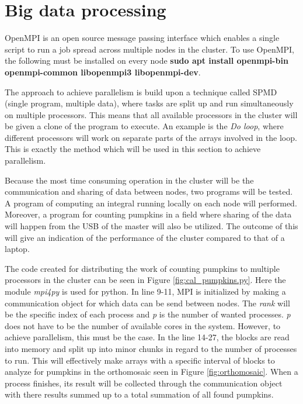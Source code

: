 \documentclass[../Head/Report.tex]{subfiles}
\begin{document}
\section{Big data processing}

OpenMPI is an open source message passing interface which enables a single script to run a job spread across multiple nodes in the cluster. To use OpenMPI, the following must be installed on every node \textbf{sudo apt install openmpi-bin openmpi-common libopenmpi3 libopenmpi-dev}. 

The approach to achieve parallelism is build upon a technique called SPMD (single program, multiple data), where tasks are split up and run simultaneously on multiple processors. This means that all available processors in the cluster will be given a clone of the program to execute. An example is the \textit{Do loop}, where different processors will work on separate parts of the arrays involved in the loop. This is exactly the method which will be used in this section to achieve parallelism.\cite{SPMD}    

Because the most time consuming operation in the cluster will be the communication and sharing of data between nodes, two programs will be tested. A program of computing an integral running locally on each node will performed. Moreover, a program for counting pumpkins in a field where sharing of the data will happen from the USB of the master will also be utilized. The outcome of this will give an indication of the performance of the cluster compared to that of a laptop.     

The code created for distributing the work of counting pumpkins to multiple processors in the cluster can be seen in Figure \ref{fig:cal_pumpkins.py}. Here the module \textit{mpi4py} is used for python. In line 9-11, MPI is initialized  by making a communication object for which data can be send between nodes. The \textit{rank} will be the specific index of each process and \textit{p} is the number of wanted processes. \textit{p} does not have to be the number of available cores in the system. However, to achieve parallelism, this must be the case. In the line 14-27, the blocks are read into memory and split up into minor chunks in regard to the number of processes to run. This will effectively make arrays with a specific interval of blocks to analyze for pumpkins in the orthomosaic seen in Figure \ref{fig:orthomosaic}. When a process finishes, its result will be collected through the communication object with there results summed up to a total summation of all found pumpkins.        
\end{document}
